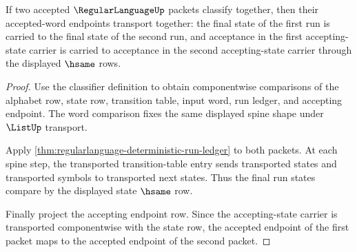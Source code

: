 \begin{theorem}
\label{thm:regularlanguage-classified-word-transport}
If two accepted $\RegularLanguageUp$ packets classify together, then their
accepted-word endpoints transport together: the final state of the first run
is carried to the final state of the second run, and acceptance in the first
accepting-state carrier is carried to acceptance in the second accepting-state
carrier through the displayed $\hsame$ rows.
\end{theorem}
\begin{proof}
Use the classifier definition to obtain componentwise comparisons of the
alphabet row, state row, transition table, input word, run ledger, and
accepting endpoint. The word comparison fixes the same displayed spine shape
under $\ListUp$ transport.

Apply \autoref{thm:regularlanguage-deterministic-run-ledger} to both packets.
At each spine step, the transported transition-table entry sends transported
states and transported symbols to transported next states. Thus the final run
states compare by the displayed state $\hsame$ row.

Finally project the accepting endpoint row. Since the accepting-state carrier
is transported componentwise with the state row, the accepted endpoint of the
first packet maps to the accepted endpoint of the second packet.
\end{proof}

